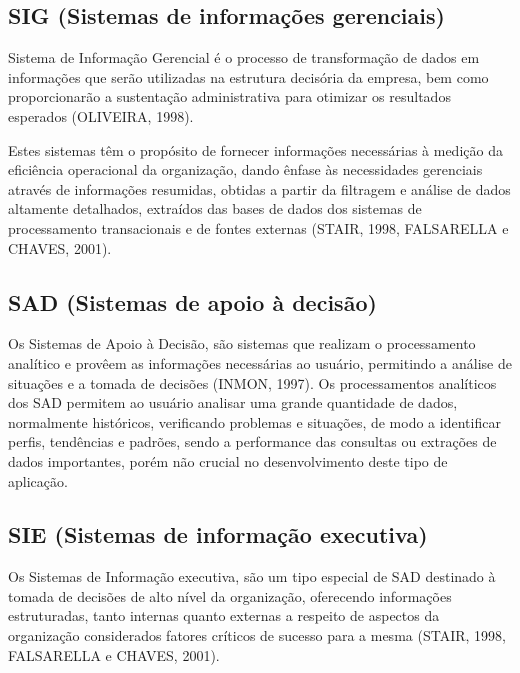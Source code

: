 \subsection{SIG (Sistemas de informações gerenciais)}

Sistema de Informação Gerencial é o processo de transformação de dados em informações que serão utilizadas na estrutura decisória da empresa, bem como proporcionarão a sustentação administrativa para otimizar os resultados esperados (OLIVEIRA, 1998).

\begin{flushleft}
	Estes sistemas têm o propósito de fornecer informações necessárias à medição da eficiência operacional da organização, dando ênfase às necessidades gerenciais através de informações resumidas, obtidas a partir da filtragem e análise de dados altamente detalhados, extraídos das bases de dados dos sistemas de processamento transacionais e de fontes externas (STAIR, 1998, FALSARELLA e CHAVES, 2001).
\end{flushleft}

\subsection{SAD (Sistemas de apoio à decisão)}

Os Sistemas de Apoio à Decisão, são sistemas que realizam o processamento analítico e provêem as informações necessárias ao usuário, permitindo a análise de situações e a tomada de decisões (INMON, 1997).
Os processamentos analíticos dos SAD permitem ao usuário analisar uma grande quantidade de dados, normalmente históricos, verificando problemas e situações, de modo a identificar perfis, tendências e padrões, sendo a performance das consultas ou extrações de dados importantes, porém não crucial no desenvolvimento deste tipo de aplicação.

\subsection{SIE (Sistemas de informação executiva)}

Os Sistemas de Informação executiva, são um tipo especial de SAD destinado à tomada de decisões de alto nível da organização, oferecendo informações estruturadas, tanto internas quanto externas a respeito de aspectos da organização considerados fatores críticos de sucesso para a mesma (STAIR, 1998, FALSARELLA e CHAVES, 2001).

